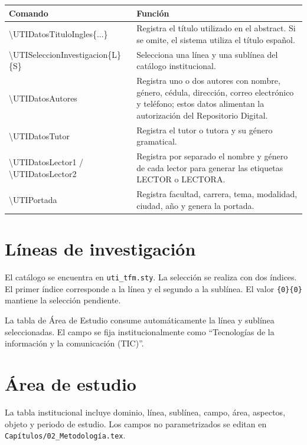 \documentclass[12pt,a4paper,oneside]{report}
\begin{document}
\begin{longtable}{|p{5.2cm}|p{7.4cm}|}
  \hline
  \textbf{Comando} & \textbf{Función} \\
  \hline
  {\scriptsize\ttfamily\textbackslash UTIDatosTituloIngles\{...\}} & Registra el título utilizado en el abstract. Si se omite, el sistema utiliza el título español. \\
  \hline
  {\scriptsize\ttfamily\textbackslash UTISeleccionInvestigacion\{L\}\{S\}} & Selecciona una línea y una sublínea del catálogo institucional. \\
  \hline
  {\scriptsize\ttfamily\textbackslash UTIDatosAutores} & Registra uno o dos autores con nombre, género, cédula, dirección, correo electrónico y teléfono; estos datos alimentan la autorización del Repositorio Digital. \\
  \hline
  {\scriptsize\ttfamily\textbackslash UTIDatosTutor} & Registra el tutor o tutora y su género gramatical. \\
  \hline
  {\scriptsize\ttfamily\textbackslash UTIDatosLector1 / \textbackslash UTIDatosLector2} & Registra por separado el nombre y género de cada lector para generar las etiquetas LECTOR o LECTORA. \\
  \hline
  {\scriptsize\ttfamily\textbackslash UTIPortada} & Registra facultad, carrera, tema, modalidad, ciudad, año y genera la portada. \\
  \hline
\end{longtable}

\section{Líneas de investigación}

El catálogo se encuentra en \texttt{uti\_tfm.sty}. La selección se realiza con dos índices. El primer índice corresponde a la línea y el segundo a la sublínea. El valor \texttt{\{0\}\{0\}} mantiene la selección pendiente.

La tabla de Área de Estudio consume automáticamente la línea y sublínea seleccionadas. El campo se fija institucionalmente como ``Tecnologías de la información y la comunicación (TIC)''.

\section{Área de estudio}

La tabla institucional incluye dominio, línea, sublínea, campo, área, aspectos, objeto y periodo de estudio. Los campos no parametrizados se editan en \texttt{Capítulos/02\_Metodología.tex}.
\end{document}
